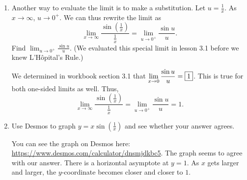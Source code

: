 \documentclass{article}
\begin{document}
\begin{enumerate}
\begin{enumerate}
    \begin{solution}
      $\displaystyle \lim_{x \to \infty} \frac{\sin\left(
      \tfrac{1}{x}\right)}{ \frac{1}{x}}$ is a
      $\frac{0}{0}$ limit, so we can use
      L'Hôpital's Rule:
      \begin{align*}
        \lim_{x\to\infty} \frac{\sin\left(\tfrac{1}{x}\right)}{\frac{1}{x}}
        & \lheq \lim_{x\to\infty} \frac{-\frac{1}{x^2}\cdot
          \cos\left(\frac{1}{x}\right)}{-\frac{1}{x^2}} \\
        \intertext{We can cancel $-\frac{1}{x^2}$ in the numerator and
          denominator:} %
        & \nolheq \lim_{x \to \infty} \cos\left(\tfrac{1}{x}\right) \\
        \shortintertext{As $x \to \infty$, $\frac{1}{x} \to 0$, so this limit
          is equal to} %
        & \nolheq \cos(0) \\
        & \nolheq \boxed{1}
      \end{align*}
    \end{solution}

  \item
    \begin{problem}[\stretch{0.5}]
      Another way to evaluate the limit is to make a substitution.
      Let $u=\tfrac{1}{x}$. As $x \to \infty$, $u \to 0^+$.
      We can thus rewrite the limit as
      \[\lim_{x \to \infty} \frac{\sin\left(\frac{1}{x}\right)}
      {\frac{1}{x}} = \lim_{u \to 0^+} \frac{\sin u}{u}.\]
      Find $\displaystyle \lim_{u \to 0^+} \frac{\sin u}{u}$. (We evaluated this special limit in lesson 3.1 before we knew L'Hôpital's Rule.)
    
    \end{problem}

    \begin{solution}
        We determined in workbook section 3.1 that
        $\displaystyle \lim_{x \to 0} \frac{\sin u}{u}=\fbox{1}$.
        This is true for both one-sided limits as well. Thus,
        \[\lim_{x \to \infty} \frac{\sin\left(\frac{1}{x}\right)}
      {\frac{1}{x}} = \lim_{u \to 0^+} \frac{\sin u}{u}=1.\]
    \end{solution}

  \item
    \begin{problem}
      Use Desmos to graph $y=x\sin(\tfrac{1}{x})$ and see whether your answer agrees.
    \end{problem}

    \begin{solution}
      You can see the graph on Desmos here: 
      \url{https://www.desmos.com/calculator/dnsmjdkbc5}.
      The graph seems to agree with our answer. There is a horizontal
      asymptote at $y=1$. As $x$ gets larger and larger, the 
      $y$-coordinate becomes closer and closer to $1$.
    \end{solution}
    


\end{enumerate}
\end{enumerate}
\end{document}
